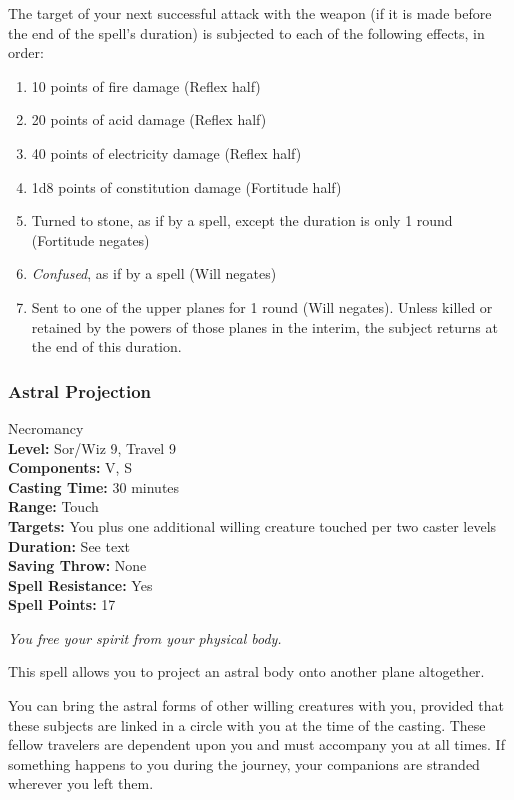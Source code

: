 The target of your next successful attack with the weapon 
(if it is made before the end of the spell's duration)
is subjected to each of the following effects, in order:
\begin{enumerate}
 \item 10 points of fire damage (Reflex half)
 \item 20 points of acid damage (Reflex half)
 \item 40 points of electricity damage (Reflex half)
 \item 1d8 points of constitution damage (Fortitude half)
 \item Turned to stone, as if by a  spell, except the duration is only 1 round (Fortitude negates)
 \item \emph{Confused}, as if by a  spell (Will negates)
 \item Sent to one of the upper planes for 1 round (Will negates). Unless killed or retained by the powers of those planes in the interim, the subject returns at the end of this duration.
\end{enumerate}
\subsubsection{Astral Projection} 
\label{Spell:AstralProjection}
Necromancy
\\ \textbf{Level:} Sor/Wiz 9, Travel 9
\\ \textbf{Components:} V, S
\\ \textbf{Casting Time:} 30 minutes
\\ \textbf{Range:} Touch
\\ \textbf{Targets:} You plus one additional willing creature touched per two caster levels
\\ \textbf{Duration:} See text
\\ \textbf{Saving Throw:} None
\\ \textbf{Spell Resistance:} Yes
\\ \textbf{Spell Points:} 17

\emph{You free your spirit from your physical body.}

This spell allows you to project an astral body onto another plane altogether.

You can bring the astral forms of other willing creatures with you, 
provided that these subjects are linked in a circle with you at the time of the casting. 
These fellow travelers are dependent upon you and must accompany you at all times. 
If something happens to you during the journey, your companions are stranded wherever you left them.

